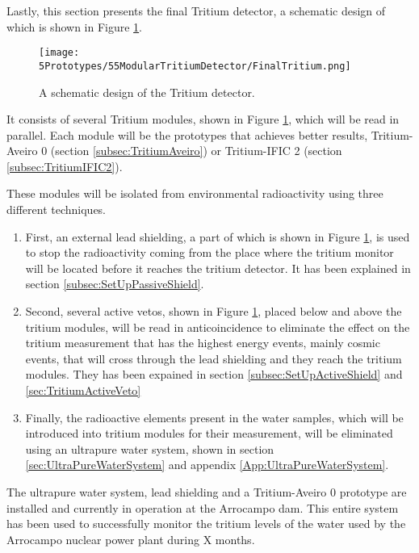 Lastly, this section presents the final Tritium detector, a schematic design of which is shown in Figure \ref{fig:TritiumDetectorSchematicDesign}.

\begin{figure}[h]
\centering
\texttt{[image: 5Prototypes/55ModularTritiumDetector/FinalTritium.png]}
\caption{A schematic design of the Tritium detector.\label{fig:TritiumDetectorSchematicDesign}}
\end{figure}

It consists of several Tritium modules, shown in Figure \ref{fig:TritiumDetectorSchematicDesign}, which will be read in parallel. Each module will be the prototypes that achieves better results, Tritium-Aveiro 0 (section \ref{subsec:TritiumAveiro}) or Tritium-IFIC 2 (section \ref{subsec:TritiumIFIC2}).

These modules will be isolated from environmental radioactivity using three different techniques.

\begin{enumerate}

\item{} First, an external lead shielding, a part of which is shown in Figure \ref{fig:TritiumDetectorSchematicDesign}, is used to stop the radioactivity coming from the place where the tritium monitor will be located before it reaches the tritium detector. It has been explained in section \ref{subsec:SetUpPassiveShield}. 

\item{} Second, several active vetos, shown in Figure \ref{fig:TritiumDetectorSchematicDesign}, placed below and above the tritium modules, will be read in anticoincidence to eliminate the effect on the tritium measurement that has the highest energy events, mainly cosmic events, that will cross through the lead shielding and they reach the tritium modules. They has been expained in section \ref{subsec:SetUpActiveShield} and \ref{sec:TritiumActiveVeto}

\item{} Finally, the radioactive elements present in the water samples, which will be introduced into tritium modules for their measurement, will be eliminated using an ultrapure water system, shown in section \ref{sec:UltraPureWaterSystem} and appendix \ref{App:UltraPureWaterSystem}.

\end{enumerate}

The ultrapure water system, lead shielding and a Tritium-Aveiro 0 prototype are installed and currently in operation at the Arrocampo dam. This entire system has been used to successfully monitor the tritium levels of the water used by the Arrocampo nuclear power plant during X months.

